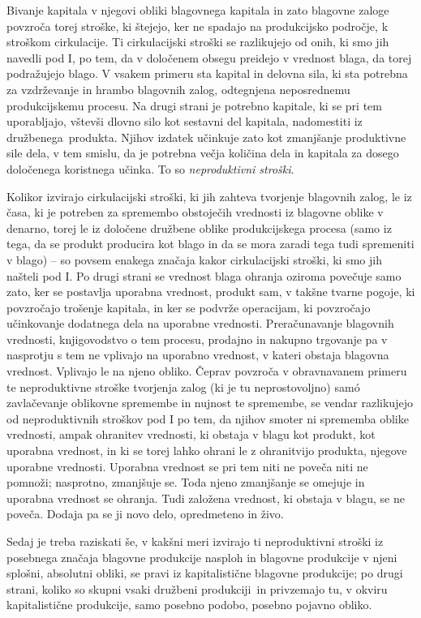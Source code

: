 \documentclass[kapital_02.tex]{subfiles}
\begin{document}
Bivanje kapitala v njegovi obliki blagovnega kapitala in zato blagovne zaloge povzroča torej stroške, ki štejejo, ker ne spadajo na produkcijsko področje, k stroškom cirkulacije.
Ti cirkulacijski stroški se razlikujejo od onih, ki smo jih navedli pod I, po tem, da v določenem obsegu preidejo v vrednost blaga, da torej podražujejo blago. %
V vsakem primeru sta kapital in delovna sila, ki sta potrebna za vzdrževanje in hrambo blagovnih zalog, odtegnjena neposrednemu produkcijskemu procesu.
Na drugi strani je potrebno kapitale, ki se pri tem uporabljajo, vštevši dlovno silo kot sestavni del kapitala, nadomestiti iz družbenega\KPEstran\ produkta.
Njihov izdatek učinkuje zato kot zmanjšanje produktivne sile dela, v tem smislu, da je potrebna večja količina dela in kapitala za dosego določenega koristnega učinka.
To so \emph{neproduktivni stroški}.

Kolikor izvirajo cirkulacijski stroški, ki jih zahteva tvorjenje blagovnih zalog, le iz časa, ki je potreben za spremembo obstoječih vrednosti iz blagovne oblike v denarno, torej le iz določene družbene oblike produkcijskega procesa (samo iz tega, da se produkt producira kot blago in da se mora zaradi tega tudi spremeniti v blago) -- so povsem enakega značaja kakor cirkulacijski stroški, ki smo jih našteli pod I. 
Po drugi strani se vrednost blaga ohranja oziroma povečuje samo zato, ker se postavlja uporabna vrednost, produkt sam, v takšne tvarne pogoje, ki povzročajo trošenje kapitala, in ker se podvrže operacijam, ki povzročajo učinkovanje dodatnega dela na uporabne vrednosti.
Preračunavanje blagovnih vrednosti, knjigovodstvo o tem procesu, prodajno in nakupno trgovanje pa v nasprotju s tem ne vplivajo na uporabno vrednost, v kateri obstaja blagovna vrednost.
Vplivajo le na njeno obliko.
Čeprav povzroča v obravnavanem primeru te neproduktivne stroške tvorjenja zalog (ki je tu neprostovoljno) sam\'o zavlačevanje oblikovne spremembe in nujnost te spremembe, se vendar razlikujejo od neproduktivnih stroškov pod I po tem, da njihov smoter ni sprememba oblike vrednosti, ampak ohranitev vrednosti, ki obstaja v blagu kot produkt, kot uporabna vrednost, in ki se torej lahko ohrani le z ohranitvijo produkta, njegove uporabne vrednosti.
Uporabna vrednost se pri tem niti ne poveča niti ne pomnoži;
nasprotno, zmanjšuje se.
Toda njeno zmanjšanje se omejuje in uporabna vrednost se ohranja. Tudi založena vrednost, ki obstaja v blagu, se ne poveča.
Dodaja pa se ji novo delo, opredmeteno in živo.

Sedaj je treba raziskati še, v kakšni meri izvirajo ti neproduktivni stroški iz posebnega značaja blagovne produkcije nasploh in blagovne produkcije v njeni splošni, absolutni obliki, se pravi iz kapitalistične blagovne produkcije; po drugi strani, koliko so skupni vsaki družbeni produkciji\KPEstran\ in privzemajo tu, v okviru kapitalistične produkcije, samo posebno podobo, posebno pojavno obliko.
\end{document}
